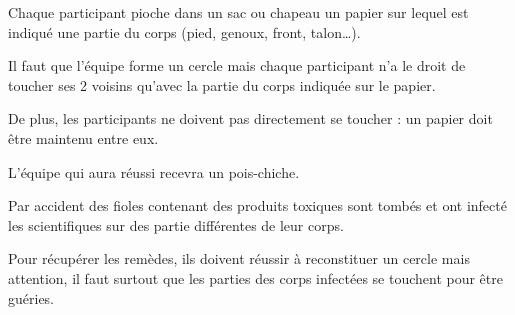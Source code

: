 \documentclass{grand-jeu}
\begin{document}
\begin{liste-materiel}
\end{liste-materiel}

\begin{regles}
Chaque participant pioche dans un sac ou chapeau un papier sur lequel est indiqué une partie du corps (pied, genoux, front, talon…).

Il faut que l’équipe forme un cercle mais chaque participant n’a le droit de toucher ses 2 voisins qu’avec la partie du corps indiquée sur le papier.

De plus, les participants ne doivent pas directement se toucher : un papier doit être maintenu entre eux.

L’équipe qui aura réussi recevra un pois-chiche.
\end{regles}

\begin{imaginaire}
Par accident des fioles contenant des produits toxiques sont tombés et ont infecté les scientifiques sur des partie différentes de leur corps.

Pour récupérer les remèdes, ils doivent réussir à reconstituer un cercle mais attention, il faut surtout que les parties des corps infectées se touchent pour être guéries.
\end{imaginaire}

\begin{moments-stop}
\end{moments-stop}
\end{document}
